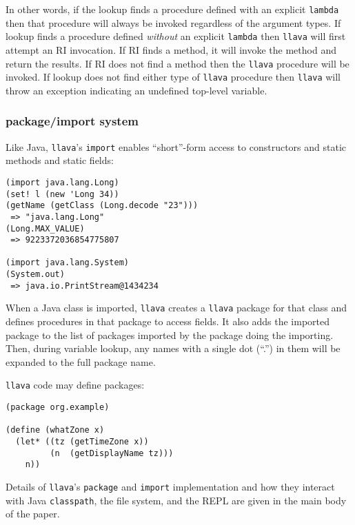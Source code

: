 \documentclass{acm-final/sig-alternate-modified}
\begin{document}
In other words, if the lookup finds a procedure defined with an
explicit {\tt lambda} then that procedure will always be invoked
regardless of the argument types.  If lookup finds a procedure defined
\emph{without} an explicit {\tt lambda} then {\tt llava} will first
attempt an RI invocation.  If RI finds a method, it will invoke the
method and return the results.  If RI does not find a method then the
{\tt llava} procedure will be invoked.  If lookup does not find either
type of {\tt llava} procedure then {\tt llava} will throw an exception
indicating an undefined top-level variable.

\subsubsection{package/import system}

Like Java, {\tt llava}'s {\tt import} enables ``short''-form access to
constructors and static methods and static fields:

\small
\begin{verbatim}
(import java.lang.Long)
(set! l (new 'Long 34))
(getName (getClass (Long.decode "23")))
 => "java.lang.Long"
(Long.MAX_VALUE)
 => 9223372036854775807

(import java.lang.System)
(System.out)
 => java.io.PrintStream@1434234
\end{verbatim}
\normalsize

When a Java class is imported, {\tt llava} creates a {\tt llava}
package for that class and defines procedures in that package to
access fields.  It also adds the imported package to the list of
packages imported by the package doing the importing.  Then, during
variable lookup, any names with a single dot (``.'') in them will be
expanded to the full package name.


{\tt llava} code may define packages:

\small
\begin{verbatim}
(package org.example)

(define (whatZone x)
  (let* ((tz (getTimeZone x))
         (n  (getDisplayName tz)))
    n))
\end{verbatim}
\normalsize


Details of {\tt llava}'s {\tt package} and {\tt import} implementation
and how they interact with Java {\tt classpath}, the file system, and
the REPL are given in the main body of the paper.
\end{document}
